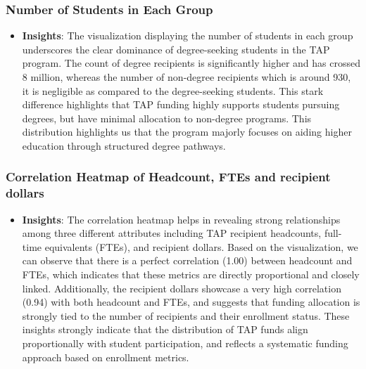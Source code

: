 \documentclass[sigconf]{acmart}
\begin{document}
\subsubsection{\textbf{Number of Students in Each Group}}
\begin{itemize}
    \begin{figure}[h] 
        \centering
        \texttt{[image: Viz5.png]}
        \caption{Number of Students in Each Group}
        \label{fig:data_viz}
    \end{figure}
    \item \textbf{Insights}:
    The visualization displaying the number of students in each group underscores the clear dominance of degree-seeking students in the TAP program. The count of degree recipients is significantly higher and has crossed 8 million, whereas the number of non-degree recipients which is around 930, it is negligible as compared to the degree-seeking students. This stark difference highlights that TAP funding highly supports students pursuing degrees, but have minimal allocation to non-degree programs. This distribution highlights us that the program majorly focuses on aiding higher education through structured degree pathways.
\end{itemize}


\subsubsection{\textbf{Correlation Heatmap of Headcount, FTEs and recipient dollars}}
\begin{itemize}
    \begin{figure}[h] 
        \centering
        \texttt{[image: Viz6.png]} 
        \caption{Correlation Heatmap of Headcount, FTEs and recipient dollars} 
        \label{fig:data_viz} 
    \end{figure}
    \item \textbf{Insights}:
    The correlation heatmap helps in revealing strong relationships among three different attributes including TAP recipient headcounts, full-time equivalents (FTEs), and recipient dollars. Based on the visualization, we can observe that there is a perfect correlation (1.00) between headcount and FTEs, which indicates that these metrics are directly proportional and closely linked. Additionally, the recipient dollars showcase a very high correlation (0.94) with both headcount and FTEs, and suggests that funding allocation is strongly tied to the number of recipients and their enrollment status. These insights strongly indicate that the distribution of TAP funds align proportionally with student participation, and reflects a systematic funding approach based on enrollment metrics.
\end{itemize}
\end{document}

